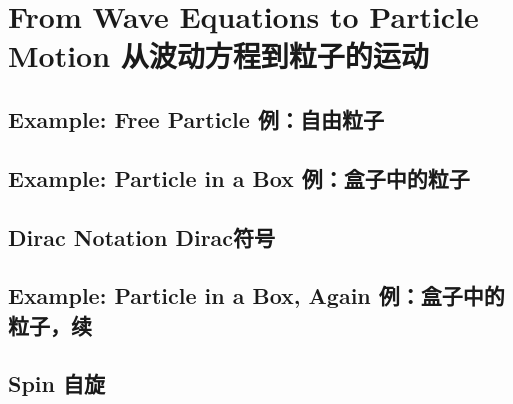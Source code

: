 \section[从波动方程到粒子的运动]{From Wave Equations to Particle Motion 从波动方程到粒子的运动}\label{sec8.5}
\subsection[例：自由粒子]{Example: Free Particle 例：自由粒子}\label{sec8.5.1}
\subsection[例：盒子中的粒子]{Example: Particle in a Box 例：盒子中的粒子}\label{sec8.5.2}
\subsection[Dirac符号]{Dirac Notation Dirac符号}\label{sec8.5.3}
\subsection[例：盒子中的粒子，续]{Example: Particle in a Box, Again 例：盒子中的粒子，续}\label{sec8.5.4}
\subsection[自旋]{Spin 自旋}\label{sec8.5.5}

